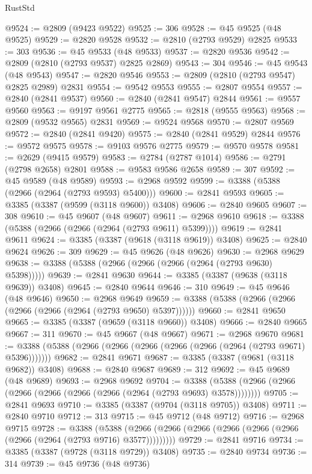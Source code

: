 \begin{lexlean}{RustStd}
\begin{coremodule}
@9524 := @2809 (@9423 @9522)
@9525 := 306
@9528 := @45 @9525 (@48 @9525)
@9529 := @2820 @9528
@9532 := @2810 (@2793 @9529) @2825
@9533 := 303
@9536 := @45 @9533 (@48 @9533)
@9537 := @2820 @9536
@9542 := @2809 (@2810 (@2793 @9537) @2825 @2869)
@9543 := 304
@9546 := @45 @9543 (@48 @9543)
@9547 := @2820 @9546
@9553 := @2809 (@2810 (@2793 @9547) @2825 @2989) @2831
@9554 := @9542 @9553
@9555 := @2807 @9554
@9557 := @2840 (@2841 @9537)
@9560 := @2840 (@2841 @9547) @2844
@9561 := @9557 @9560
@9563 := @9197 @9561 @2775
@9565 := @2818 (@9555 @9563)
@9568 := @2809 (@9532 @9565) @2831
@9569 := @9524 @9568
@9570 := @2807 @9569
@9572 := @2840 (@2841 @9420)
@9575 := @2840 (@2841 @9529) @2844
@9576 := @9572 @9575
@9578 := @9103 @9576 @2775
@9579 := @9570 @9578
@9581 := @2629 (@9415 @9579)
@9583 := @2784 (@2787 @1014)
@9586 := @2791 (@2798 @2658) @2801
@9588 := @9583 @9586 @2658
@9589 := 307
@9592 := @45 @9589 (@48 @9589)
@9593 := @2968 @9592
@9599 := @3388 (@5388 (@2966 (@2964 (@2793 @9593) @5400)))
@9600 := @2841 @9593
@9605 := @3385 (@3387 (@9599 (@3118 @9600)) @3408)
@9606 := @2840 @9605
@9607 := 308
@9610 := @45 @9607 (@48 @9607)
@9611 := @2968 @9610
@9618 := @3388 (@5388 (@2966 (@2966 (@2964 (@2793 @9611) @5399))))
@9619 := @2841 @9611
@9624 := @3385 (@3387 (@9618 (@3118 @9619)) @3408)
@9625 := @2840 @9624
@9626 := 309
@9629 := @45 @9626 (@48 @9626)
@9630 := @2968 @9629
@9638 := @3388 (@5388 (@2966 (@2966 (@2966 (@2964 (@2793 @9630) @5398)))))
@9639 := @2841 @9630
@9644 := @3385 (@3387 (@9638 (@3118 @9639)) @3408)
@9645 := @2840 @9644
@9646 := 310
@9649 := @45 @9646 (@48 @9646)
@9650 := @2968 @9649
@9659 := @3388 (@5388 (@2966 (@2966 (@2966 (@2966 (@2964 (@2793 @9650) @5397))))))
@9660 := @2841 @9650
@9665 := @3385 (@3387 (@9659 (@3118 @9660)) @3408)
@9666 := @2840 @9665
@9667 := 311
@9670 := @45 @9667 (@48 @9667)
@9671 := @2968 @9670
@9681 := @3388 (@5388 (@2966 (@2966 (@2966 (@2966 (@2966 (@2964 (@2793 @9671) @5396)))))))
@9682 := @2841 @9671
@9687 := @3385 (@3387 (@9681 (@3118 @9682)) @3408)
@9688 := @2840 @9687
@9689 := 312
@9692 := @45 @9689 (@48 @9689)
@9693 := @2968 @9692
@9704 := @3388 (@5388 (@2966 (@2966 (@2966 (@2966 (@2966 (@2966 (@2964 (@2793 @9693) @3578))))))))
@9705 := @2841 @9693
@9710 := @3385 (@3387 (@9704 (@3118 @9705)) @3408)
@9711 := @2840 @9710
@9712 := 313
@9715 := @45 @9712 (@48 @9712)
@9716 := @2968 @9715
@9728 := @3388
    (@5388 (@2966 (@2966 (@2966 (@2966 (@2966 (@2966 (@2966 (@2964 (@2793 @9716) @3577)))))))))
@9729 := @2841 @9716
@9734 := @3385 (@3387 (@9728 (@3118 @9729)) @3408)
@9735 := @2840 @9734
@9736 := 314
@9739 := @45 @9736 (@48 @9736)

\end{coremodule}
\end{lexlean}
